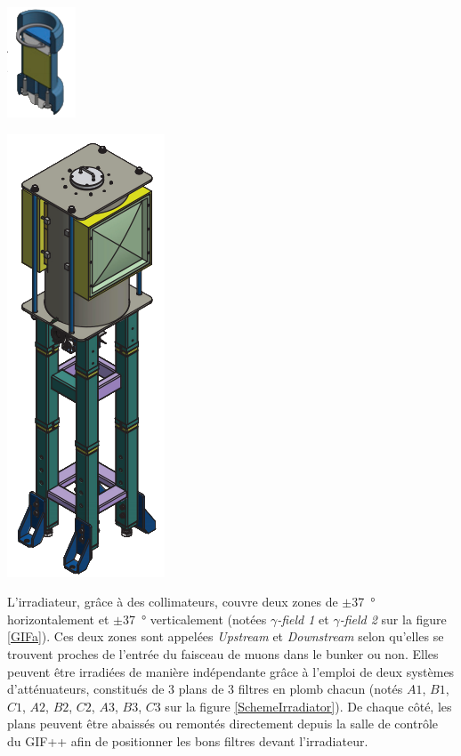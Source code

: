 \marginpar
{
	\centering
	\includegraphics[width=0.5\marginparwidth]{GLA/Source.png}
	\label{Source}
}

\marginpar
{
	\centering
	\includegraphics[width=0.5\marginparwidth]{GLA/Irradiateur.png}
	\label{Irradiateur}
}

L'irradiateur, grâce à des collimateurs, couvre deux zones de $\pm$\SI{37}{\degree} horizontalement et $\pm$\SI{37}{\degree} verticalement (notées \textit{$\gamma$-field 1} et \textit{$\gamma$-field 2} sur la figure \ref{GIFa}). Ces deux zones sont appelées \textit{Upstream} et \textit{Downstream} selon qu'elles se trouvent proches de l'entrée du faisceau de muons dans le bunker ou non. Elles peuvent être irradiées de manière indépendante grâce à l'emploi de deux systèmes d'atténuateurs, constitués de \num{3} plans de \num{3} filtres en plomb chacun (notés $A1$, $B1$, $C1$, $A2$, $B2$, $C2$, $A3$, $B3$, $C3$ sur la figure \ref{SchemeIrradiator}). De chaque côté, les plans peuvent être abaissés ou remontés directement depuis la salle de contrôle du GIF++ afin de positionner les bons filtres devant l'irradiateur.

